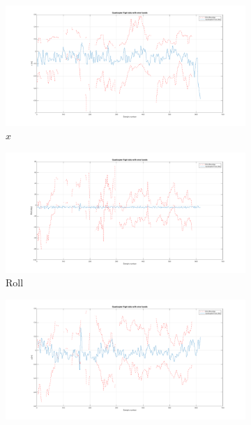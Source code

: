 \begin{figure}
  \centering
  \begin{subfigure}{0.45\textwidth}
    \includegraphics[clip, trim = 150 0 120 0, width=\textwidth]{figures/chapter5/x}
    \caption{$x$}
  \end{subfigure}
  \begin{subfigure}{0.45\textwidth}
    \includegraphics[clip, trim = 150 0 120 0, width=\textwidth]{figures/chapter5/roll}
    \caption{Roll}
  \end{subfigure}
  \begin{subfigure}{0.45\textwidth}
    \includegraphics[clip, trim = 150 0 120 0, width=\textwidth]{figures/chapter5/y}

\end{subfigure}
\end{figure}
